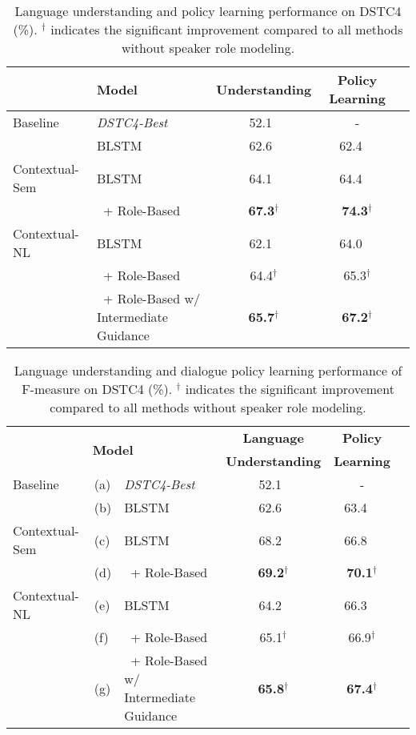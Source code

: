 \documentclass[11pt,letterpaper]{article}
\begin{document}
\begin{table*}
\centering
\begin{tabular}{ | l l | c | c | c | }
    \hline
      & \bf Model & \bf Understanding & \bf Policy Learning\\ \hline\hline
    Baseline & \emph{DSTC4-Best} & 52.1~ & -\\
    & BLSTM & 62.6~ & 62.4~~\\\hline
    Contextual-Sem & BLSTM & 64.1~ & 64.4~~\\
    & ~+ Role-Based & \bf 67.3$^\dag$ & \bf 74.3$^\dag$\\\hline
    Contextual-NL & BLSTM & 62.1~ & 64.0~~\\
    & ~+ Role-Based  & 64.4$^\dag$ & 65.3$^\dag$\\
     & ~+ Role-Based w/ Intermediate Guidance & \bf 65.7$^\dag$ & \bf 67.2$^\dag$\\
    \hline
  \end{tabular}
  \vspace{-2mm}
\caption{Language understanding and policy learning performance on DSTC4 (\%). $^\dag$ indicates the significant improvement compared to all methods without speaker role modeling.}
\label{tab:res}
\vspace{-4mm}
\end{table*}
\fi


\begin{table*}
\centering
\begin{tabular}{ |l  l l | c | c | c | }
    \hline
    \multicolumn{3}{|c|}{\multirow{2}{*}{\bf Model}} & \bf Language & \bf Policy \\
    &  & & \bf Understanding & \bf Learning\\\hline\hline
   Baseline & (a) & \emph{DSTC4-Best} & 52.1~ & -\\
   & (b) & BLSTM  & 62.6~ & 63.4~~\\\hline
   Contextual-Sem & (c) & BLSTM & 68.2~ & 66.8~~\\
   & (d) & ~+ Role-Based  & \bf 69.2$^\dag$ & \bf 70.1$^\dag$\\\hline
   Contextual-NL & (e) & BLSTM & 64.2~ & 66.3~~\\
   & (f) & ~+ Role-Based   & 65.1$^\dag$ & 66.9$^\dag$\\
   & (g) & ~+ Role-Based w/ Intermediate Guidance &  \bf  65.8$^\dag$ & \bf 67.4$^\dag$\\
    \hline
  \end{tabular}
  \vspace{-1mm}
\caption{Language understanding and dialogue policy learning performance of F-measure on DSTC4 (\%). $^\dag$ indicates the significant improvement compared to all methods without speaker role modeling.}
\label{tab:res}
\end{table*}
\end{document}
